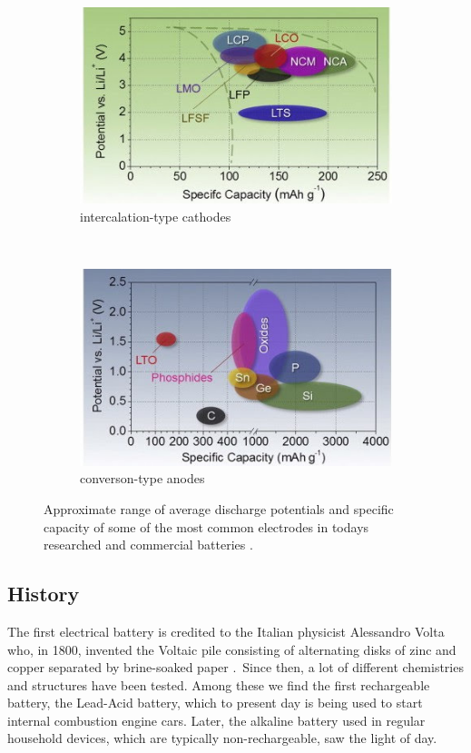 \documentclass[Main/main.tex]{subfiles}
\begin{document}
\begin{figure}[ht]
	\begin{subfigure}[b]{0.5\textwidth}
		\includegraphics[scale=0.62]{Uploads/1_discharge_specific_cathode}
		\caption{intercalation-type cathodes}
		\label{fig:1_dis_a}
	\end{subfigure}
	~ \quad 
	\begin{subfigure}[b]{0.5\textwidth}		
		\includegraphics[scale=0.62]{Uploads/1_discharge_specific_anodes}
		\caption{converson-type anodes}
		\label{fig:1_dis_b}
	\end{subfigure}
    \caption{Approximate range of average discharge potentials and specific capacity of some of the most common electrodes in todays researched and commercial batteries \cite{1_rev_liion}.}
    \label{fig:1_discharge_specific}
\end{figure}

\newpage
\subsection{History}

The first electrical battery is credited to the Italian physicist Alessandro Volta who, in 1800, invented the Voltaic pile consisting of alternating disks of zinc and copper separated by brine-soaked paper \cite{1_volta}.\  Since then, a lot of different chemistries and structures have been tested. Among these we find the first rechargeable battery, the Lead-Acid battery, which to present day is being used to start internal combustion engine cars. Later, the alkaline battery used in regular household devices, which are typically non-rechargeable, saw the light of day. \cite{1_yazami}
\end{document}
